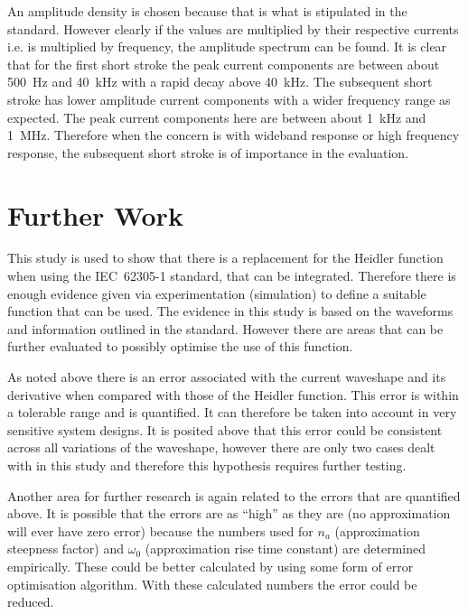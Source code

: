 An amplitude density is chosen because that is what is stipulated in the standard. However clearly if the values are multiplied by their respective currents i.e.  is multiplied by frequency, the amplitude spectrum can be found. It is clear that for the first short stroke the peak current components are between about 500~Hz and 40~kHz with a rapid decay above 40~kHz. The subsequent short stroke has lower amplitude current components with a wider frequency range as expected. The peak current components here are between about 1~kHz and 1~MHz. Therefore when the concern is with wideband response or high frequency response, the subsequent short stroke is of importance in the evaluation.


\section{Further Work}
\label{sec:discussion_further_work}
This study is used to show that there is a replacement for the Heidler function when using the IEC~62305-1 standard, that can be integrated. Therefore there is enough evidence given via experimentation (simulation) to define a suitable function that can be used. The evidence in this study is based on the waveforms and information outlined in the standard. However there are areas that can be further evaluated to possibly optimise the use of this function.

As noted above there is an error associated with the current waveshape and its derivative when compared with those of the Heidler function. This error is within a tolerable range and is quantified. It can therefore be taken into account in very sensitive system designs. It is posited above that this error could be consistent across all variations of the waveshape, however there are only two cases dealt with in this study and therefore this hypothesis requires further testing.

Another area for further research is again related to the errors that are quantified above. It is possible that the errors are as ``high'' as they are (no approximation will ever have zero error) because the numbers used for $n_a$ (approximation steepness factor) and $\omega_0$ (approximation rise time constant) are determined empirically. These could be better calculated by using some form of error optimisation algorithm. With these calculated numbers the error could be reduced.

